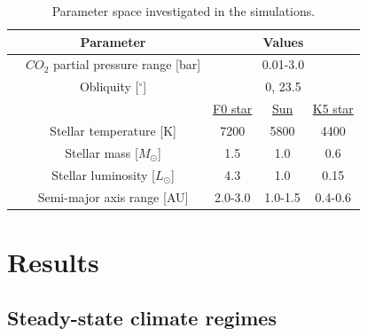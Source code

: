 \documentclass[fleqn,usenatbib]{mnras}
\begin{document}

\begin{table}
	\centering
	\caption{Parameter space investigated in the simulations.}
	\label{tab:parameters}
	\begin{tabular}{ccccc}
		\hline
		&\multicolumn{1}{c}{Parameter}&\multicolumn{3}{c}{Values}\\
		\hline
		&\multicolumn{1}{c}{$CO_{\mathrm{2}}$ partial pressure range [bar]}&\multicolumn{3}{c}{0.01-3.0}\\
		&\multicolumn{1}{c}{Obliquity [$^{\circ}$] }&\multicolumn{3}{c}{0, 23.5}\\
		&\multicolumn{1}{c}{}&\multicolumn{1}{c}{\underline{F0 star}}&\multicolumn{1}{c}{\underline{Sun}}&\multicolumn{1}{c}{\underline{K5 star}}\\
		&\multicolumn{1}{c}{Stellar temperature [K]}&\multicolumn{1}{c}{7200}&\multicolumn{1}{c}{5800}&\multicolumn{1}{c}{4400}\\
		&\multicolumn{1}{c}{Stellar mass [$M_{\odot}$]}&\multicolumn{1}{c}{1.5}&\multicolumn{1}{c}{1.0}&\multicolumn{1}{c}{0.6}\\
		&\multicolumn{1}{c}{Stellar luminosity [$L_{\odot}$]}&\multicolumn{1}{c}{4.3}&\multicolumn{1}{c}{1.0}&\multicolumn{1}{c}{0.15}\\
		&\multicolumn{1}{c}{Semi-major axis range [AU]}&\multicolumn{1}{c}{2.0-3.0}&\multicolumn{1}{c}{1.0-1.5}&\multicolumn{1}{c}{0.4-0.6}\\
		\hline
	\end{tabular}
\end{table}

\section{Results}

\subsection{Steady-state climate regimes}
\end{document}
